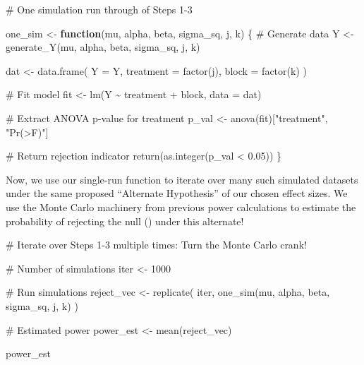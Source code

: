 \documentclass[
  letterpaper,
  DIV=11,
  numbers=noendperiod]{scrartcl}
\newenvironment{Shaded}{\begin{snugshade}}{\end{snugshade}}
\newcommand{\AttributeTok}[1]{\textcolor[rgb]{0.40,0.45,0.13}{#1}}
\newcommand{\CommentTok}[1]{\textcolor[rgb]{0.37,0.37,0.37}{#1}}
\newcommand{\ControlFlowTok}[1]{\textcolor[rgb]{0.00,0.23,0.31}{\textbf{#1}}}
\newcommand{\DecValTok}[1]{\textcolor[rgb]{0.68,0.00,0.00}{#1}}
\newcommand{\FloatTok}[1]{\textcolor[rgb]{0.68,0.00,0.00}{#1}}
\newcommand{\FunctionTok}[1]{\textcolor[rgb]{0.28,0.35,0.67}{#1}}
\newcommand{\NormalTok}[1]{\textcolor[rgb]{0.00,0.23,0.31}{#1}}
\newcommand{\OtherTok}[1]{\textcolor[rgb]{0.00,0.23,0.31}{#1}}
\newcommand{\SpecialCharTok}[1]{\textcolor[rgb]{0.37,0.37,0.37}{#1}}
\newcommand{\StringTok}[1]{\textcolor[rgb]{0.13,0.47,0.30}{#1}}
\begin{document}
\begin{Shaded}
\begin{Highlighting}[]
\CommentTok{\# One simulation run through of Steps 1{-}3}

\NormalTok{one\_sim }\OtherTok{\textless{}{-}} \ControlFlowTok{function}\NormalTok{(mu, alpha, beta, sigma\_sq, j, k) \{}
  \CommentTok{\# Generate data}
\NormalTok{  Y }\OtherTok{\textless{}{-}} \FunctionTok{generate\_Y}\NormalTok{(mu, alpha, beta, sigma\_sq, j, k)}
  
\NormalTok{  dat }\OtherTok{\textless{}{-}} \FunctionTok{data.frame}\NormalTok{(}
    \AttributeTok{Y =}\NormalTok{ Y,}
    \AttributeTok{treatment =} \FunctionTok{factor}\NormalTok{(j),}
    \AttributeTok{block =} \FunctionTok{factor}\NormalTok{(k)}
\NormalTok{  )}
  
  \CommentTok{\# Fit model}
\NormalTok{  fit }\OtherTok{\textless{}{-}} \FunctionTok{lm}\NormalTok{(Y }\SpecialCharTok{\textasciitilde{}}\NormalTok{ treatment }\SpecialCharTok{+}\NormalTok{ block, }\AttributeTok{data =}\NormalTok{ dat)}
  
  \CommentTok{\# Extract ANOVA p{-}value for treatment}
\NormalTok{  p\_val }\OtherTok{\textless{}{-}} \FunctionTok{anova}\NormalTok{(fit)[}\StringTok{"treatment"}\NormalTok{, }\StringTok{"Pr(\textgreater{}F)"}\NormalTok{]}
  
  \CommentTok{\# Return rejection indicator}
  \FunctionTok{return}\NormalTok{(}\FunctionTok{as.integer}\NormalTok{(p\_val }\SpecialCharTok{\textless{}} \FloatTok{0.05}\NormalTok{))}
\NormalTok{\}}
\end{Highlighting}
\end{Shaded}

Now, we use our single-run function to iterate over many such simulated
datasets under the same proposed ``Alternate Hypothesis'' of our chosen
effect sizes. We use the Monte Carlo machinery from previous power
calculations to estimate the probability of rejecting the null () under
this alternate!

\begin{Shaded}
\begin{Highlighting}[]
\CommentTok{\# Iterate over Steps 1{-}3 multiple times: Turn the Monte Carlo crank!}

\CommentTok{\# Number of simulations}
\NormalTok{iter }\OtherTok{\textless{}{-}} \DecValTok{1000}

\CommentTok{\# Run simulations}
\NormalTok{reject\_vec }\OtherTok{\textless{}{-}} \FunctionTok{replicate}\NormalTok{(}
\NormalTok{  iter,}
  \FunctionTok{one\_sim}\NormalTok{(mu, alpha, beta, sigma\_sq, j, k)}
\NormalTok{)}

\CommentTok{\# Estimated power}
\NormalTok{power\_est }\OtherTok{\textless{}{-}} \FunctionTok{mean}\NormalTok{(reject\_vec)}

\NormalTok{power\_est}
\end{Highlighting}
\end{Shaded}
\end{document}
